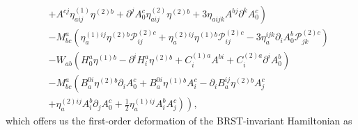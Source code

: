 \documentclass[a4paper,12pt]{article}
\begin{document}
\begin{eqnarray}
&&\left. +A^{cj}\eta _{aij}^{(1)}\eta ^{(2)b}+\partial ^{j}A_{0}^{c}\eta
_{aij}^{(2)}\eta ^{(2)b}+3\eta _{aijk}A^{bj}\partial ^{k}A_{0}^{c}\right) 
\nonumber \\
&&-M_{bc}^{a}\left( \eta _{a}^{(1)ij}\eta ^{(2)b}\mathcal{P}%
_{ij}^{(2)c}+\eta _{a}^{(2)ij}\eta ^{(1)b}\mathcal{P}_{ij}^{(2)c}-3\eta
_{a}^{ijk}\partial _{i}A_{0}^{b}\mathcal{P}_{jk}^{(2)c}\right)  \nonumber \\
&&-W_{ab}\left( H_{0}^{a}\eta ^{(1)b}-\partial ^{i}H_{i}^{a}\eta
^{(2)b}+C_{i}^{(1)a}A^{bi}+C_{i}^{(2)a}\partial ^{i}A_{0}^{b}\right) 
\nonumber \\
&&-M_{bc}^{a}\left( B_{a}^{0i}\eta ^{(2)b}\partial
_{i}A_{0}^{c}+B_{a}^{0i}\eta ^{(1)b}A_{i}^{c}-\partial _{i}B_{a}^{ij}\eta
^{(2)b}A_{j}^{c}\right.  \nonumber \\
&&\left. \left. +\eta _{a}^{(2)ij}A_{i}^{b}\partial _{j}A_{0}^{c}+\frac{1}{2}%
\eta _{a}^{(1)ij}A_{i}^{b}A_{j}^{c}\right) \right) ,  \label{xx79}
\end{eqnarray}
which offers us the first-order deformation of the BRST-invariant
Hamiltonian as 
\end{document}
